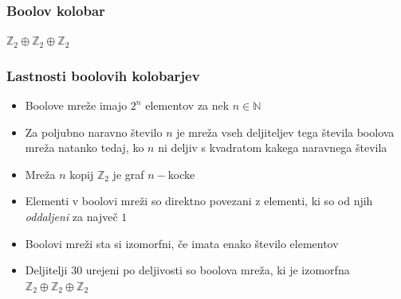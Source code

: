 \documentclass[slovene]{beamer}
\begin{document}
\begin{frame}
\frametitle{Boolov kolobar}
\begin{center}
$\mathbb{Z}_2 \oplus \mathbb{Z}_2 \oplus \mathbb{Z}_2$
\end{center}
\begin{figure}
\centering
{}
\end{figure}
\end{frame}

\begin{frame}
\frametitle{Lastnosti boolovih kolobarjev}
\begin{block}{}
\begin{itemize}
\item Boolove mreže imajo $2^n$ elementov za nek $n \in \mathbb{N}$
\item Za poljubno naravno število $n$ je mreža vseh deljiteljev tega števila boolova mreža natanko tedaj, ko $n$ ni deljiv s kvadratom kakega naravnega števila\\
\item Mreža $n$ kopij $\mathbb{Z}_2$ je graf $n-$kocke
\item Elementi v boolovi mreži so direktno povezani z elementi, ki so od njih \textit{oddaljeni} za največ $1$
\item Boolovi mreži sta si izomorfni, če imata enako število elementov
\item Deljitelji $30$ urejeni po deljivosti so boolova mreža, ki je izomorfna $\mathbb{Z}_2 \oplus \mathbb{Z}_2 \oplus \mathbb{Z}_2$
\end{itemize}

\end{block}
\end{frame}
\end{document}
